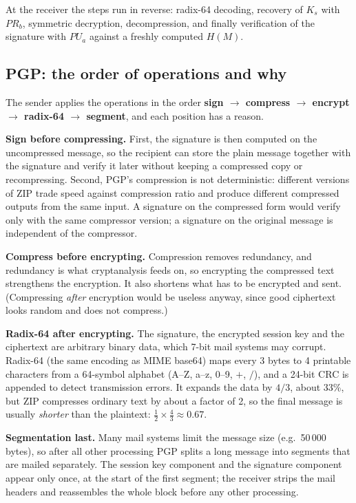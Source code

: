 At the receiver the steps run in reverse: radix-64 decoding, recovery of $K_s$ with $PR_b$, symmetric decryption, decompression, and finally verification of the signature with $PU_a$ against a freshly computed $H(M)$.

\subsection{PGP: the order of operations and why \hot\new}

The sender applies the operations in the order \textbf{sign $\to$ compress $\to$ encrypt $\to$ radix-64 $\to$ segment}, and each position has a reason.

\textbf{Sign before compressing.} First, the signature is then computed on the uncompressed message, so the recipient can store the plain message together with the signature and verify it later without keeping a compressed copy or recompressing. Second, PGP's compression is not deterministic: different versions of ZIP trade speed against compression ratio and produce different compressed outputs from the same input. A signature on the compressed form would verify only with the same compressor version; a signature on the original message is independent of the compressor.

\textbf{Compress before encrypting.} Compression removes redundancy, and redundancy is what cryptanalysis feeds on, so encrypting the compressed text strengthens the encryption. It also shortens what has to be encrypted and sent. (Compressing \emph{after} encryption would be useless anyway, since good ciphertext looks random and does not compress.)

\textbf{Radix-64 after encrypting.} The signature, the encrypted session key and the ciphertext are arbitrary binary data, which 7-bit mail systems may corrupt. Radix-64 (the same encoding as MIME base64) maps every 3 bytes to 4 printable characters from a 64-symbol alphabet (A--Z, a--z, 0--9, $+$, $/$), and a 24-bit CRC is appended to detect transmission errors. It expands the data by $4/3$, about 33\%, but ZIP compresses ordinary text by about a factor of 2, so the final message is usually \emph{shorter} than the plaintext: $\frac{1}{2} \times \frac{4}{3} \approx 0.67$.

\textbf{Segmentation last.} Many mail systems limit the message size (e.g.\ 50\,000 bytes), so after all other processing PGP splits a long message into segments that are mailed separately. The session key component and the signature component appear only once, at the start of the first segment; the receiver strips the mail headers and reassembles the whole block before any other processing.

